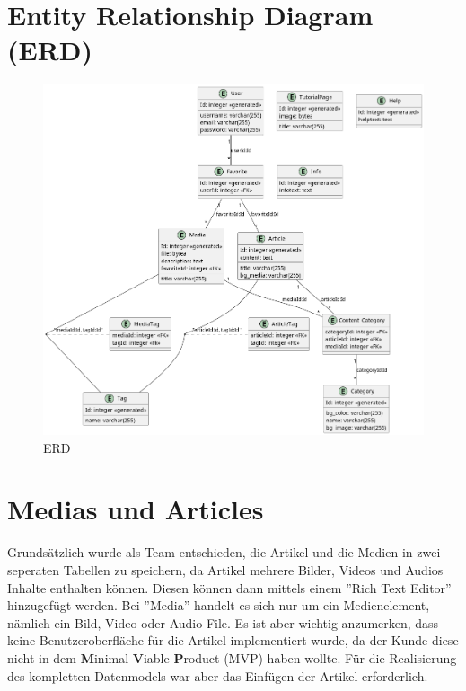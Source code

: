 \section{\textbf{E}ntity \textbf{R}elationship \textbf{D}iagram (ERD)}
\begin{spacing}{1}

  \begin{figure}[H]
    \centering
    \includegraphics[height=1\textwidth]{./pics/erd.png}
    \caption{ERD}

  \end{figure}
\end{spacing}


\section{Medias und Articles}

Grundsätzlich wurde als Team entschieden,
die Artikel und die Medien in zwei seperaten Tabellen zu speichern,
da Artikel mehrere Bilder, Videos und Audios Inhalte enthalten können.
Diesen können dann mittels einem ''Rich Text Editor'' hinzugefügt werden.
Bei ''Media'' handelt es sich nur um ein Medienelement,
nämlich ein Bild, Video oder Audio File. Es ist aber wichtig anzumerken,
dass keine Benutzeroberfläche für die Artikel implementiert wurde, da der Kunde
diese nicht in dem \textbf{M}inimal \textbf{V}iable \textbf{P}roduct (MVP) haben wollte.
Für die Realisierung des kompletten Datenmodels war aber das Einfügen der Artikel erforderlich.

